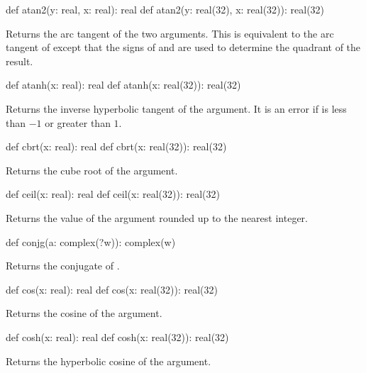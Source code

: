 \begin{protohead}
def atan2(y: real, x: real): real
def atan2(y: real(32), x: real(32)): real(32)
\end{protohead}
\begin{protobody}
Returns the arc tangent of the two arguments.  This is equivalent to
the arc tangent of  except that the signs of 
and  are used to determine the quadrant of the result.
\end{protobody}

\begin{protohead}
def atanh(x: real): real
def atanh(x: real(32)): real(32)
\end{protohead}
\begin{protobody}
Returns the inverse hyperbolic tangent of the argument.  It is an error
if  is less than $-1$ or greater than $1$.
\end{protobody}

\begin{protohead}
def cbrt(x: real): real
def cbrt(x: real(32)): real(32)
\end{protohead}
\begin{protobody}
Returns the cube root of the argument.
\end{protobody}

\begin{protohead}
def ceil(x: real): real
def ceil(x: real(32)): real(32)
\end{protohead}
\begin{protobody}
Returns the value of the argument rounded up to the nearest integer.
\end{protobody}

\begin{protohead}
def conjg(a: complex(?w)): complex(w)
\end{protohead}
\begin{protobody}
Returns the conjugate of .
\end{protobody}

\begin{protohead}
def cos(x: real): real
def cos(x: real(32)): real(32)
\end{protohead}
\begin{protobody}
Returns the cosine of the argument.
\end{protobody}

\begin{protohead}
def cosh(x: real): real
def cosh(x: real(32)): real(32)
\end{protohead}
\begin{protobody}
Returns the hyperbolic cosine of the argument.
\end{protobody}

